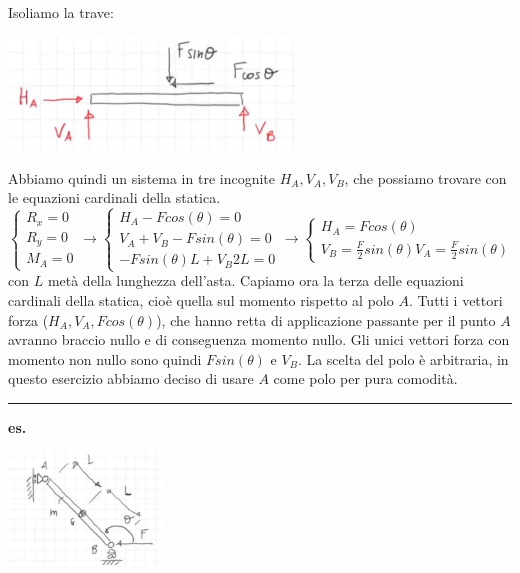\newline
Isoliamo la trave:
\begin{center}
    \includegraphics[height=3cm]{../lezione6/img13.jpg}
\end{center}
Abbiamo quindi un sistema in tre incognite $H_A, V_A, V_B$, che possiamo trovare con le equazioni cardinali della statica.
\[
    \begin{cases}
        R_x = 0\\
        R_y = 0\\
        M_A = 0
    \end{cases} \rightarrow \begin{cases}
        H_A - F cos(\theta) = 0\\
        V_A + V_B - F sin(\theta) = 0\\
        - F sin(\theta) L + V_B 2 L = 0
    \end{cases} \rightarrow \begin{cases}
        H_A = F cos(\theta)\\
        V_B = \frac{F}{2} sin(\theta)
        V_A = \frac{F}{2} sin(\theta)
    \end{cases}
\]
con $L$ metà della lunghezza dell'asta.\newline
Capiamo ora la terza delle equazioni cardinali della statica, cioè quella sul momento rispetto al polo $A$. Tutti i vettori forza ($H_A, V_A, F cos(\theta)$), che hanno retta di applicazione passante per il punto $A$ avranno braccio nullo e di conseguenza momento nullo. Gli unici vettori forza con momento non nullo sono quindi $F sin(\theta)$ e $V_B$.\newline
\newline
La scelta del polo è arbitraria, in questo esercizio abbiamo deciso di usare $A$ come polo per pura comodità. \newline
\rule{\textwidth}{0,4pt}
\textbf{es.} 
\begin{center}
    \includegraphics[height=3cm]{../lezione6/img14.JPG}
\end{center}

